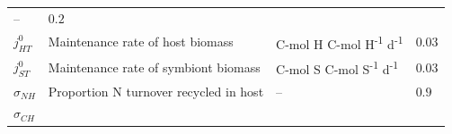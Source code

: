 \documentclass[]{elsarticle} %
\begin{document}
\begin{longtable}[c]{@{}llll@{}}
\begin{minipage}[t]{0.25\columnwidth}
--
\strut\end{minipage} &
\begin{minipage}[t]{0.12\columnwidth}\raggedright\strut
\(0.2\)
\strut\end{minipage}\tabularnewline
\begin{minipage}[t]{0.10\columnwidth}\raggedright\strut
\(j_{HT}^0\)
\strut\end{minipage} &
\begin{minipage}[t]{0.45\columnwidth}\raggedright\strut
Maintenance rate of host biomass
\strut\end{minipage} &
\begin{minipage}[t]{0.25\columnwidth}\raggedright\strut
C-mol H C-mol H\textsuperscript{-1} d\textsuperscript{-1}
\strut\end{minipage} &
\begin{minipage}[t]{0.12\columnwidth}\raggedright\strut
\(0.03\)
\strut\end{minipage}\tabularnewline
\begin{minipage}[t]{0.10\columnwidth}\raggedright\strut
\(j_{ST}^0\)
\strut\end{minipage} &
\begin{minipage}[t]{0.45\columnwidth}\raggedright\strut
Maintenance rate of symbiont biomass
\strut\end{minipage} &
\begin{minipage}[t]{0.25\columnwidth}\raggedright\strut
C-mol S C-mol S\textsuperscript{-1} d\textsuperscript{-1}
\strut\end{minipage} &
\begin{minipage}[t]{0.12\columnwidth}\raggedright\strut
\(0.03\)
\strut\end{minipage}\tabularnewline
\begin{minipage}[t]{0.10\columnwidth}\raggedright\strut
\(\sigma_{NH}\)
\strut\end{minipage} &
\begin{minipage}[t]{0.45\columnwidth}\raggedright\strut
Proportion N turnover recycled in host
\strut\end{minipage} &
\begin{minipage}[t]{0.25\columnwidth}\raggedright\strut
--
\strut\end{minipage} &
\begin{minipage}[t]{0.12\columnwidth}\raggedright\strut
\(0.9\)
\strut\end{minipage}\tabularnewline
\begin{minipage}[t]{0.10\columnwidth}\raggedright\strut
\(\sigma_{CH}\)

\end{minipage}
\end{longtable}
\end{document}
